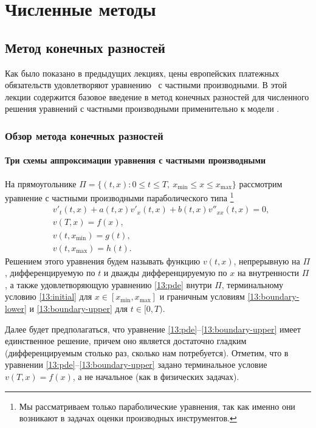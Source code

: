 \part{Численные методы}
\chapter{Метод конечных разностей}
\label{ch:fdm}
\chaptertoc

Как было показано в предыдущих лекциях, цены европейских платежных обязательств удовлетворяют уравнению \bs\ с частными производными.
В этой лекции содержится базовое введение в метод конечных разностей для численного решения уравнений с частными производными применительно к модели \bs.


\section{Обзор метода конечных разностей}
\subsection{Три схемы аппроксимации уравнения с частными производными}

На прямоугольнике $\Pi =\{(t,x): 0\le t \le T,\ x_\text{min} \le x \le x_\text{max}\}$ рассмотрим уравнение с частными производными параболического типа%
\footnote{Мы рассматриваем только параболические уравнения, так как именно они возникают в задачах оценки производных инструментов.}
\begin{align}[left=\empheqlbrace]
\label{13:pde}
&v'_t(t,x) + a(t,x) v'_x(t,x) + b(t,x) v''_{xx}(t,x) = 0, \\
\label{13:initial}
&v(T,x) = f(x), \\
\label{13:boundary-lower}
&v(t,x_\text{min}) = g(t),\\
\label{13:boundary-upper}
&v(t,x_\text{max}) = h(t).
\end{align}
Решением этого уравнения будем называть функцию $v(t,x)$, непрерывную на $\Pi$, дифференцируемую по $t$ и дважды дифференцируемую по $x$ на внутренности $\Pi$, а также удовлетворяющую уравнению \eqref{13:pde} внутри $\Pi$, терминальному условию \eqref{13:initial} для $x\in[x_\text{min},x_\text{max}]$ и граничным условиям \eqref{13:boundary-lower} и \eqref{13:boundary-upper} для $t\in[0,T)$.

Далее будет предполагаться, что уравнение \eqref{13:pde}--\eqref{13:boundary-upper} имеет единственное решение, причем оно является достаточно гладким (дифференцируемым столько раз, сколько нам потребуется). 
Отметим, что в уравнении \eqref{13:pde}--\eqref{13:boundary-upper} задано терминальное условие $v(T,x) = f(x)$, а не начальное (как в физических задачах).

